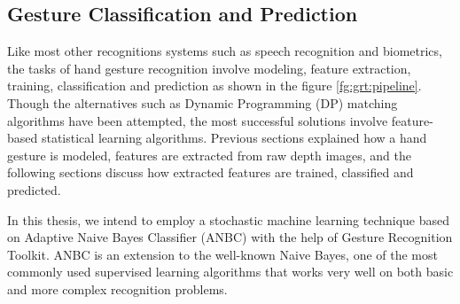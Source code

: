 

\subsection{Gesture Classification and Prediction} Like most other recognitions systems such as speech recognition and biometrics, the tasks of hand gesture recognition involve modeling, feature extraction, training, classification and prediction as shown in the figure \ref{fg:grt:pipeline}. Though the alternatives such as Dynamic Programming (DP) matching algorithms have been attempted, the most successful solutions involve feature-based statistical learning algorithms. Previous sections explained how a hand gesture is modeled, features are extracted from raw depth images, and the following sections discuss how extracted features are trained, classified and predicted.

In this thesis, we intend to employ a stochastic machine learning technique based on Adaptive Naive Bayes Classifier (ANBC) with the help of Gesture Recognition Toolkit. ANBC is an extension to the well-known Naive Bayes, one of the most commonly used supervised learning algorithms that works very well on both basic and more complex recognition problems.

 
